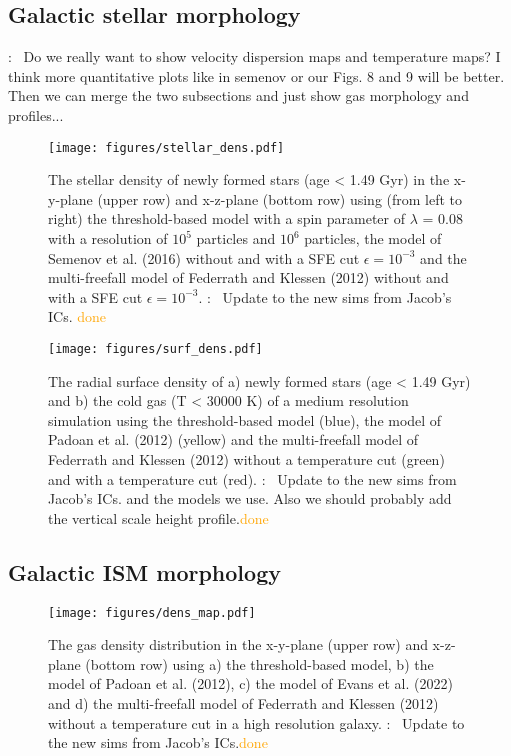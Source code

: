 \documentclass{aa}
\newcommand{\T}[1]{{\color{blue}{\bf T}:~ #1}}
\begin{document}
\subsection{Galactic stellar morphology}
\T{Do we really want to show velocity dispersion maps and temperature maps? I think more quantitative plots like in semenov or our Figs. 8 and 9 will be better.
Then we can merge the two subsections and just show gas morphology and profiles...}

\begin{figure*}
\begin{center}
    \texttt{[image: figures/stellar\_dens.pdf]}
    \caption{The stellar density of newly formed stars (age < 1.49 Gyr) in the x-y-plane (upper row) and x-z-plane (bottom row) using (from left to right) the threshold-based model with a spin parameter of $\lambda$ = 0.08 with a resolution of $10^5$ particles and $10^6$ particles, the model of Semenov et al. (2016) without and with a SFE cut $\epsilon = 10^{-3}$ and the multi-freefall model of Federrath and Klessen (2012)  without and with a SFE cut $\epsilon = 10^{-3}$. \T{Update to the new sims from Jacob's ICs.} \textcolor{orange}{done}}
\end{center}
\end{figure*}


\begin{figure*}
\begin{center}
    \texttt{[image: figures/surf\_dens.pdf]}
    \caption{The radial surface density of a) newly formed stars (age < 1.49 Gyr) and b) the cold gas (T < 30000 K) of a medium resolution simulation using the threshold-based model (blue), the model of Padoan et al. (2012) (yellow) and the multi-freefall model of Federrath and Klessen (2012) without a temperature cut (green) and with a temperature cut (red). \T{Update to the new sims from Jacob's ICs. and the models we use. Also we should probably add the vertical scale height profile.}\textcolor{orange}{done}}
\end{center}
\end{figure*}


\subsection{Galactic ISM morphology}
\begin{figure*}
\begin{center}
    \texttt{[image: figures/dens\_map.pdf]}
    \caption{The gas density distribution in the x-y-plane (upper row) and x-z-plane (bottom row) using a) the
threshold-based model, b) the model of Padoan et al. (2012), c) the model of Evans et al. (2022) and d) the multi-freefall model of Federrath and Klessen (2012) without a temperature cut in a high resolution galaxy. \T{Update to the new sims from Jacob's ICs.}\textcolor{orange}{done}
}
\end{center}
\end{figure*}
\end{document}
